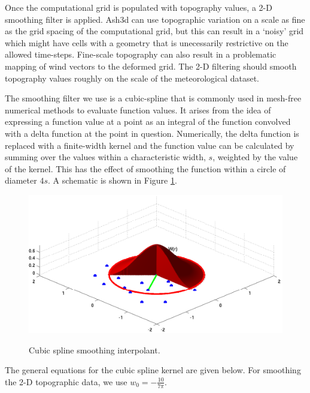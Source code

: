 Once the computational grid is populated with topography values, a 2-D smoothing filter
is applied. Ash3d can use topographic variation on a scale as fine as the grid spacing of
the computational grid, but this can result in a `noisy' grid which might have cells with
a geometry that is unecessarily restrictive on the allowed time-steps. Fine-scale
topography can also result in a problematic mapping of wind vectors to the deformed grid.
The 2-D filtering should smooth topography values roughly on the scale of the 
meteorological dataset.

The smoothing filter we use is a cubic-spline that is commonly used in mesh-free numerical
methods to evaluate function values. It arises from the idea of expressing a function
value at a point as an integral of the function convolved with a delta function at the point
in question. Numerically, the delta function is replaced with a finite-width kernel and
the function value can be calculated by summing over the values within a
characteristic width, $s$, weighted by the value of the kernel. This has the effect of
smoothing the function within a circle of diameter $4s$.
A schematic is shown in Figure \ref{FigTopo_kernel}.

\begin{figure}[htbp]\vspace*{0cm}\hspace*{0cm}
\includegraphics[angle=0,scale=0.4]{Figures/Apx_Topo/AGU_kernal.pdf}\\
\parbox{15cm}{\caption{\label{FigTopo_kernel}
Cubic spline smoothing interpolant.
}}
\end{figure}

The general equations for the cubic spline kernel are given below. For smoothing
the 2-D topographic data, we use $w_0=-\frac{10}{7\pi}$.

